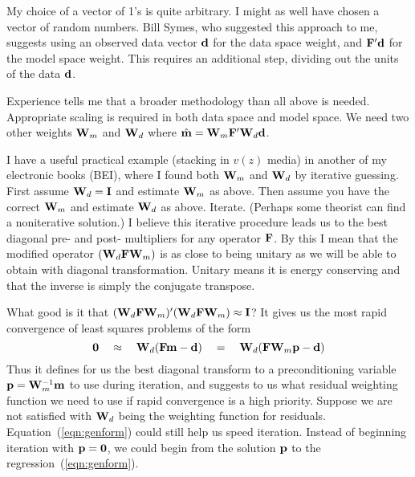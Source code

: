 \par
My choice of a vector of 1's is quite arbitrary.
I might as well have chosen a vector of random numbers.
Bill Symes, who suggested this approach to me,
suggests using an observed data vector $\bold d$ for the data space weight,
and $\bold F' \bold d$ for the model space weight.
This requires an additional step, dividing out the units of the data $\bold d$.

\par
Experience tells me that a broader methodology than all above is needed.
Appropriate scaling is required in both data space and model space.
We need two other weights
$\bold W_m$ and
$\bold W_d$ where
$\hat{\bold m} = \bold W_m \bold F'\bold W_d \bold d$.


\par
I have a useful practical example (stacking in $v(z)$ media)
in another of my electronic books (BEI),
where I found both
$\bold W_m$ and
$\bold W_d$ by iterative guessing.
First assume $\bold W_d =\bold I$ and estimate $\bold W_m$ as above.
Then assume you have the correct $\bold W_m$ and estimate $\bold W_d$ as above.
Iterate.
(Perhaps some theorist can find a noniterative solution.)
I believe this iterative procedure leads us to the best diagonal
pre- and post- multipliers for any operator $\bold F$.  
By this I mean that the modified operator 
$(\bold W_d \bold F \bold W_m)$
is as close to being unitary as we will be able to obtain
with diagonal transformation.
Unitary means it is energy conserving and that the inverse
is simply the conjugate transpose.
\par
What good is it that
$(\bold W_d \bold F \bold W_m)'
(\bold W_d \bold F \bold W_m) \approx \bold I$?
It gives us the most rapid convergence of least squares problems of the form
\begin{equation}
\label{eqn:genform}
\bold 0 \quad\approx\quad \bold W_d ( \bold F\bold m - \bold d)
\quad =\quad               \bold W_d ( \bold F\bold W_m \bold p - \bold d)
\end{equation}
Thus it defines for us the best
diagonal transform to a
preconditioning variable
$\bold p=\bold W_m^{-1}\bold m$ to use during iteration,
and suggests to us what residual weighting function we need to use if
rapid convergence is a high priority.
Suppose we are not satisfied with $\bold W_d$ being the weighting function
for residuals.  Equation~(\ref{eqn:genform}) could still help us speed iteration.
Instead of beginning iteration with $\bold p=\bold 0$,
we could begin from the solution $\bold p$
to the regression~(\ref{eqn:genform}).

